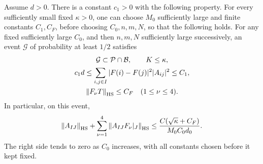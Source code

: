 \begin{lemma}\label{van:good}
Assume $d>0$. There is a constant $c_1>0$ with the following property.
For every sufficiently small fixed $\kappa>0$, one can choose $M_0$
sufficiently large and finite constants $C_1,C_F$, before choosing
$C_0,n,m,N$, so that the following holds. For any fixed sufficiently
large $C_0$, and then $n,m,N$ sufficiently large successively, an event
$\mathcal G$ of probability at least $1/2$ satisfies
\begin{gather}
 \mathcal G\subset\mathcal P\cap\mathcal B,\qquad
 K\leq\kappa,\label{van:good-transmission}\\
 c_1d\leq
 \sum_{i,j\in I}|F(i)-F(j)|^2|A_{ij}|^2
 \leq C_1,\label{van:good-jumps}\\
 \left\lVert F_\nu T\right\rVert_{\mathrm{HS}}\leq C_F
 \quad (1\leq\nu\leq4).\label{van:good-weighted}
\end{gather}
In particular, on this event,
\begin{equation}\label{van:external-small}
 \left\lVert A_{IJ}\right\rVert_{\mathrm{HS}}
 +\sum_{\nu=1}^4\left\lVert A_{IJ}F_\nu|_J\right\rVert_{\mathrm{HS}}
 \leq \frac{C(\sqrt\kappa+C_F)}{M_0C_0d_0}.
\end{equation}
The right side tends to zero as $C_0$ increases, with all constants
chosen before it kept fixed.
\end{lemma}

